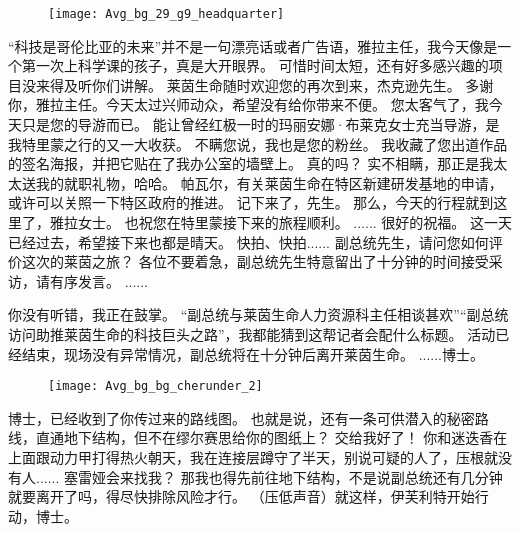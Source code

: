 \documentclass[openany]{book}
\begin{document}
\begin{figure}[h]
    \centering
    \texttt{[image: Avg\_bg\_29\_g9\_headquarter]}
\end{figure}
\begin{dialogue}
     “科技是哥伦比亚的未来”并不是一句漂亮话或者广告语，雅拉主任，我今天像是一个第一次上科学课的孩子，真是大开眼界。
     可惜时间太短，还有好多感兴趣的项目没来得及听你们讲解。
     莱茵生命随时欢迎您的再次到来，杰克逊先生。
     多谢你，雅拉主任。今天太过兴师动众，希望没有给你带来不便。
     您太客气了，我今天只是您的导游而已。
     能让曾经红极一时的玛丽安娜·布莱克女士充当导游，是我特里蒙之行的又一大收获。
     不瞒您说，我也是您的粉丝。
     我收藏了您出道作品的签名海报，并把它贴在了我办公室的墙壁上。
     真的吗？
     实不相瞒，那正是我太太送我的就职礼物，哈哈。
     帕瓦尔，有关莱茵生命在特区新建研发基地的申请，或许可以关照一下特区政府的推进。
     记下来了，先生。
     那么，今天的行程就到这里了，雅拉女士。
     也祝您在特里蒙接下来的旅程顺利。
     ......
     很好的祝福。
     这一天已经过去，希望接下来也都是晴天。
     快拍、快拍......
     副总统先生，请问您如何评价这次的莱茵之旅？
     各位不要着急，副总统先生特意留出了十分钟的时间接受采访，请有序发言。
     ......
\end{dialogue}

\begin{dialogue}
     你没有听错，我正在鼓掌。
     “副总统与莱茵生命人力资源科主任相谈甚欢”“副总统访问助推莱茵生命的科技巨头之路”，我都能猜到这帮记者会配什么标题。
     活动已经结束，现场没有异常情况，副总统将在十分钟后离开莱茵生命。
     ......博士。
\end{dialogue}

\begin{figure}[h]
    \centering
    \texttt{[image: Avg\_bg\_bg\_cherunder\_2]}
\end{figure}
\begin{dialogue}
     博士，已经收到了你传过来的路线图。
     也就是说，还有一条可供潜入的秘密路线，直通地下结构，但不在缪尔赛思给你的图纸上？
     交给我好了！
     你和迷迭香在上面跟动力甲打得热火朝天，我在连接层蹲守了半天，别说可疑的人了，压根就没有人......
     塞雷娅会来找我？
     那我也得先前往地下结构，不是说副总统还有几分钟就要离开了吗，得尽快排除风险才行。
     （压低声音）就这样，伊芙利特开始行动，博士。
\end{dialogue}
\end{document}
